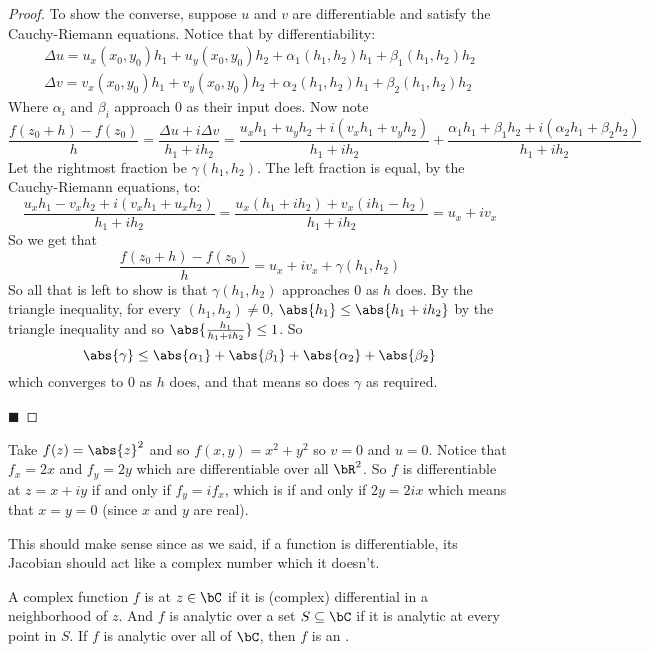 \documentclass[10pt]{article}
\begin{document}
\begin{proof}
    To show the converse, suppose $u$ and $v$ are differentiable and satisfy the Cauchy-Riemann equations.
    Notice that by differentiability:
    \begin{gather*}
        \Delta u = u_x(x_0,y_0)h_1 + u_y(x_0,y_0)h_2 + \alpha_1(h_1,h_2)h_1 + \beta_1(h_1,h_2)h_2 \\
        \Delta v = v_x(x_0,y_0)h_1 + v_y(x_0,y_0)h_2 + \alpha_2(h_1,h_2)h_1 + \beta_2(h_1,h_2)h_2
    \end{gather*}
    Where $\alpha_i$ and $\beta_i$ approach $0$ as their input does.
    Now note
    \[ \frac{f(z_0+h)-f(z_0)}h = \frac{\Delta u + i\Delta v}{h_1+ih_2} = \frac{u_xh_1+u_yh_2+i(v_xh_1+v_yh_2)}{h_1+ih_2} + \frac{\alpha_1h_1+\beta_1h_2+i(\alpha_2h_1+\beta_2h_2)}{h_1+ih_2} \]
    Let the rightmost fraction be $\gamma(h_1,h_2)$.
    The left fraction is equal, by the Cauchy-Riemann equations, to:
    \[ \frac{u_xh_1-v_xh_2 + i(v_xh_1+u_xh_2)}{h_1+ih_2} = \frac{u_x(h_1+ih_2)+v_x(ih_1-h_2)}{h_1+ih_2} = u_x + iv_x \]
    So we get that
    \[ \frac{f(z_0+h) - f(z_0)}h = u_x + iv_x + \gamma(h_1,h_2) \]
    So all that is left to show is that $\gamma(h_1,h_2)$ approaches $0$ as $h$ does.
    By the triangle inequality, for every $(h_1,h_2)\neq0$, $\abs{h_1}\leq\abs{h_1+ih_2}$ by the triangle inequality and so $\abs{\frac{h_1}{h_1+ih_2}}\leq1$.
    So
    \[ \abs{\gamma} \leq \abs{\alpha_1} + \abs{\beta_1} + \abs{\alpha_2} + \abs{\beta_2} \]
    which converges to $0$ as $h$ does, and that means so does $\gamma$ as required.

    \hfill$\blacksquare$

\end{proof}

\begin{exam*}

    Take $f(z)=\abs{z}^2$ and so $f(x,y)=x^2+y^2$ so $v=0$ and $u=0$.
    Notice that $f_x=2x$ and $f_y=2y$ which are differentiable over all $\bR^2$.
    So $f$ is differentiable at $z=x+iy$ if and only if $f_y=if_x$, which is if and only if $2y=2ix$ which means that $x=y=0$ (since $x$ and $y$ are real).

\end{exam*}

This should make sense since as we said, if a function is differentiable, its Jacobian should act like a complex number which it doesn't.

\begin{defn*}

    A complex function $f$ is  at $z\in\bC$ if it is (complex) differential in a neighborhood of $z$.
    And $f$ is analytic over a set $S\subseteq\bC$ if it is analytic at every point in $S$.
    If $f$ is analytic over all of $\bC$, then $f$ is an .

\end{defn*}
\end{document}
